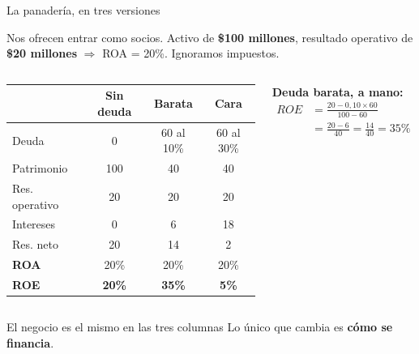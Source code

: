 \documentclass[aspectratio=169,10pt]{beamer}
\begin{document}
\begin{frame}{La panadería, en tres versiones}

Nos ofrecen entrar como socios. Activo de \textbf{\$100 millones}, resultado operativo de \textbf{\$20 millones} $\Rightarrow$ ROA = 20\%.
Ignoramos impuestos.

\begin{columns}[T]
\begin{center}
\small
\begin{tabular}{lccc}
\toprule
 & \textbf{Sin deuda} & \textbf{Barata} & \textbf{Cara} \\
\midrule
Deuda          & 0   & 60 al 10\% & 60 al 30\% \\
Patrimonio     & 100 & 40 & 40 \\
Res. operativo & 20  & 20 & 20 \\
Intereses      & 0   & 6  & 18 \\
Res. neto      & 20  & 14 & 2  \\
\midrule
\textbf{ROA}   & 20\% & 20\% & 20\% \\
\textbf{ROE}   & \textbf{20\%} & \textbf{35\%} & \textbf{5\%} \\
\bottomrule
\end{tabular}
\end{center}

\textbf{Deuda barata, a mano:}
\[
\begin{aligned}
ROE &= \frac{20 - 0{,}10 \times 60}{100 - 60} \\[2pt]
    &= \frac{20 - 6}{40} = \frac{14}{40} = 35\%
\end{aligned}
\]
\end{columns}

\vspace{0.2cm}
\begin{alertblock}{El negocio es el mismo en las tres columnas}
Lo único que cambia es \textbf{cómo se financia}.
\end{alertblock}
\end{frame}
\end{document}
